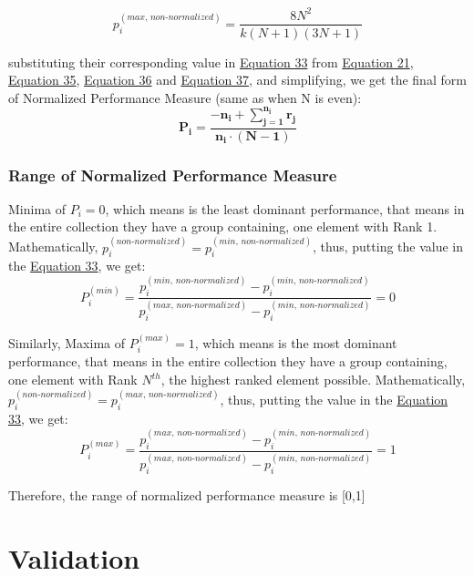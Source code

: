 \documentclass[man,floatsintext]{apa7}
\begin{document}
\begin{equation}
	\label{eq:maxima-odd}
	p_i^{(max, \, non\text{-}normalized)} = \frac{8N^2}{k (N+1)(3N+1)}
\end{equation}

substituting their corresponding value in \hyperref[eq:normalized-simpler]{Equation 33} from \hyperref[p-non-normalized]{Equation 21},  
\hyperref[eq:even-SUDH-odd]{Equation 35}, \hyperref[eq:minima-odd]{Equation 36} and \hyperref[eq:maxima-odd]{Equation 37}, and simplifying, we get the final form of Normalized Performance Measure (same as when N is even):
\begin{equation}
	\boxed{
		\mathbf{
			P_i = \frac{-n_i +  \sum\limits_{j=1}^{n_i} r_j}{n_i \cdot (N - 1)}}
	}
\end{equation}


\subsubsection{Range of Normalized Performance Measure}
Minima of $P_i = 0$, which means is the least dominant performance, that means in the entire collection they have a group containing, one element with Rank 1. Mathematically, $p_i^{(non\text{-}normalized)} =  p_i^{(min, \, non\text{-}normalized)}$, thus, putting the value in the \hyperref[eq:normalized-simpler]{Equation 33}, we get:
\begin{equation}
	P_i^{(min)} = \frac{p_i^{(min, \, non\text{-}normalized)} - p_i^{(min, \, non\text{-}normalized)}}{p_i^{(max, \, non\text{-}normalized)} - p_i^{(min, \, non\text{-}normalized)}} = 0
\end{equation}

Similarly,
Maxima of $P_i^{(max)} = 1$, which means is the most dominant performance, that means in the entire collection they have a group containing, one element with Rank $N^{th}$, the highest ranked element possible. Mathematically, $p_i^{(non\text{-}normalized)} =  p_i^{(max, \, non\text{-}normalized)}$, thus, putting the value in the \hyperref[eq:normalized-simpler]{Equation 33}, we get:
\begin{equation}
	P_i^{(max)} = \frac{p_i^{(max, \, non\text{-}normalized)} - p_i^{(min, \, non\text{-}normalized)}}{p_i^{(max, \, non\text{-}normalized)} - p_i^{(min, \, non\text{-}normalized)}} = 1
\end{equation}

Therefore, the range of normalized performance measure is [0,1]


\section{Validation}
\end{document}

